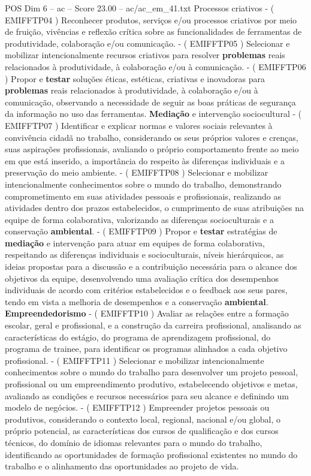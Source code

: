 \begin{textsample}{POS Dim 6 – ac – Score 23.00 – ac/ac\_em\_41.txt}
Processos criativos - ( EMIFFTP04 ) Reconhecer produtos, serviços e/ou processos criativos por meio de fruição, vivências e reflexão crítica sobre as funcionalidades de ferramentas de produtividade, colaboração e/ou comunicação. - ( EMIFFTP05 ) Selecionar e mobilizar intencionalmente recursos criativos para resolver \textbf{problemas} reais relacionados à produtividade, à colaboração e/ou à comunicação. - ( EMIFFTP06 ) Propor e \textbf{testar} soluções éticas, estéticas, criativas e inovadoras para \textbf{problemas} reais relacionados à produtividade, à colaboração e/ou à comunicação, observando a necessidade de seguir as boas práticas de segurança da informação no uso das ferramentas. \textbf{Mediação} e intervenção sociocultural - ( EMIFFTP07 ) Identificar e explicar normas e valores sociais relevantes à convivência cidadã no trabalho, considerando os seus próprios valores e crenças, suas aspirações profissionais, avaliando o próprio comportamento frente ao meio em que está inserido, a importância do respeito às diferenças individuais e a preservação do meio ambiente. - ( EMIFFTP08 ) Selecionar e mobilizar intencionalmente conhecimentos sobre o mundo do trabalho, demonstrando comprometimento em suas atividades pessoais e profissionais, realizando as atividades dentro dos prazos estabelecidos, o cumprimento de suas atribuições na equipe de forma colaborativa, valorizando as diferenças socioculturais e a conservação \textbf{ambiental}. - ( EMIFFTP09 ) Propor e \textbf{testar} estratégias de \textbf{mediação} e intervenção para atuar em equipes de forma colaborativa, respeitando as diferenças individuais e socioculturais, níveis hierárquicos, as ideias propostas para a discussão e a contribuição necessária para o alcance dos objetivos da equipe, desenvolvendo uma avaliação crítica dos desempenhos individuais de acordo com critérios estabelecidos e o feedback aos seus pares, tendo em vista a melhoria de desempenhos e a conservação \textbf{ambiental}. \textbf{Empreendedorismo} - ( EMIFFTP10 ) Avaliar as relações entre a formação escolar, geral e profissional, e a construção da carreira profissional, analisando as características do estágio, do programa de aprendizagem profissional, do programa de trainee, para identificar os programas alinhados a cada objetivo profissional. - ( EMIFFTP11 ) Selecionar e mobilizar intencionalmente conhecimentos sobre o mundo do trabalho para desenvolver um projeto pessoal, profissional ou um empreendimento produtivo, estabelecendo objetivos e metas, avaliando as condições e recursos necessários para seu alcance e definindo um modelo de negócios. - ( EMIFFTP12 ) Empreender projetos pessoais ou produtivos, considerando o contexto local, regional, nacional e/ou global, o próprio potencial, as características dos cursos de qualificação e dos cursos técnicos, do domínio de idiomas relevantes para o mundo do trabalho, identificando as oportunidades de formação profissional existentes no mundo do trabalho e o alinhamento das oportunidades ao projeto de vida.


\end{textsample}
